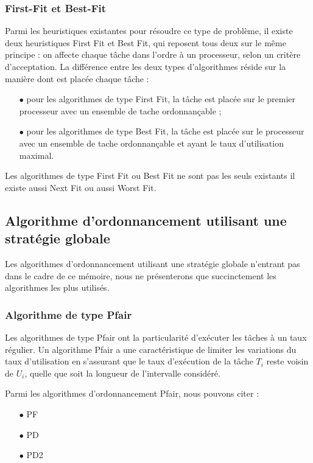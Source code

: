 \subsubsection{First-Fit et Best-Fit}
\vspace{-1cm}
Parmi les heuristiques existantes pour résoudre ce type de problème, il existe deux heuristiques First Fit et Best Fit, qui reposent tous deux sur le même principe : on affecte chaque tâche dans l'ordre à un processeur, selon un critère d'acceptation.
La différence entre les deux types d'algorithmes réside sur la manière dont est placée chaque tâche :
\begin{itemize}
\item[$\bullet$] pour les algorithmes de type First Fit, la tâche est placée sur le premier processeur avec un ensemble de tache ordonnançable ;
\item[$\bullet$] pour les algorithmes de type Best Fit, la tâche est placée sur le processeur avec un ensemble de tache ordonnançable et ayant le taux d'utilisation maximal.
\end{itemize}

Les algorithmes de type First Fit ou Best Fit ne sont pas les seuls existants il existe aussi Next Fit ou aussi Worst Fit.

\subsection{Algorithme d'ordonnancement utilisant une stratégie globale}
\vspace{-1cm}
Les algorithmes d'ordonnancement utilisant une stratégie globale n'entrant pas dans le cadre de ce mémoire, nous ne présenterons que succinctement les algorithmes les plus utilisés.
\subsubsection{Algorithme de type Pfair}
\vspace{-1cm}
Les algorithmes de type Pfair ont la particularité d'exécuter les tâches à un taux régulier. Un algorithme Pfair a une caractéristique de limiter les variations du taux d’utilisation 
en s'assurant que le taux d'exécution de la tâche $T_i$ reste voisin de $U_i$, quelle que soit la longueur de l'intervalle considéré.

Parmi les algorithmes d'ordonnancement Pfair, nous pouvons citer :
\begin{itemize}
\item[$\bullet$] PF \cite{BCPV96}
\item[$\bullet$] PD \cite{BGP95}
\item[$\bullet$] PD2 \cite{AS00}
\end{itemize}

